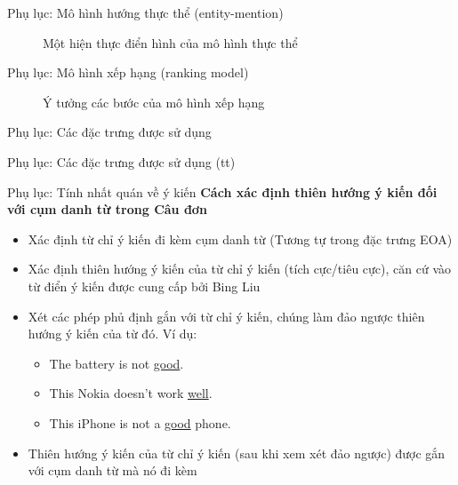 \documentclass[9pt,xcolor=table,hyperref=unicode]{beamer}
\begin{document}
		\begin{frame}{Phụ lục: Mô hình hướng thực thể (entity-mention)}
			\begin{figure}[H]
				\centering
				\scalebox{.8}{}
				\caption{Một hiện thực điển hình của mô hình thực thể}
				\label{fig:entitymention}
			\end{figure}
		\end{frame}

		\begin{frame}{Phụ lục: Mô hình xếp hạng (ranking model)}
			\begin{figure}[H]
				\centering
				\scalebox{.8}{}
				\caption{Ý tưởng các bước của mô hình xếp hạng}
				\label{fig:rankingmodel}
			\end{figure}
		\end{frame}

		\begin{frame}{Phụ lục: Các đặc trưng được sử dụng}		
			\begin{table}[]		
			\parbox{\textwidth}{
				\centering			
				\fontsize{6pt}{7}\selectfont		
					
				\caption{Các đặc trưng được sử dụng trong hệ thống}
			}
			\end{table}
		\end{frame}	

		\begin{frame}{Phụ lục: Các đặc trưng được sử dụng (tt)}				
			\begin{table}[]		
			\parbox{\textwidth}{
				\centering
				\fontsize{6pt}{7}\selectfont			
					
				\caption{Các đặc trưng được sử dụng trong hệ thống (tt)}
			}
			\end{table}		
		\end{frame}

		\begin{frame}{Phụ lục: Tính nhất quán về ý kiến}			
			\textbf{Cách xác định thiên hướng ý kiến đối với cụm danh từ trong Câu đơn}
			\begin{itemize}
				\item{Xác định từ chỉ ý kiến đi kèm cụm danh từ (Tương tự trong đặc trưng EOA)}
				\item{Xác định thiên hướng ý kiến của từ chỉ ý kiến (tích cực/tiêu cực), căn cứ vào từ điển ý kiến được cung cấp bởi Bing Liu}
				\item{Xét các phép phủ định gắn với từ chỉ ý kiến, chúng làm đảo ngược thiên hướng ý kiến của từ đó. Ví dụ: \\
					\begin{itemize}
						\item{The battery is not \underline{good}.}
						\item{This Nokia doesn't work \underline{well}.}
						\item{This iPhone is not a \underline{good} phone.}
					\end{itemize}}
				\item{Thiên hướng ý kiến của từ chỉ ý kiến (sau khi xem xét đảo ngược) được gắn với cụm danh từ mà nó đi kèm}
			\end{itemize}								
		\end{frame}
\end{document}
